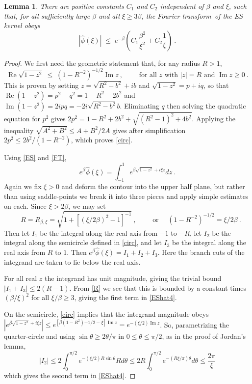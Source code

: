 \documentclass[10pt]{article}
\newcommand{\be}{\begin{equation}}
\newcommand{\ee}{\end{equation}}
\DeclareMathOperator{\re}{Re}
\DeclareMathOperator{\im}{Im}
\newtheorem{lem}[thm]{Lemma}
\newcommand{\freq}{\beta}          %
\newcommand{\FT}{Fourier transform}
\begin{document}
\begin{lem}
  There are positive constants $C_1$ and $C_2$ independent of
  $\freq$ and $\xi$, such that, for all
  sufficiently large $\freq$ and all $\xi\ge 3\freq$,
  the \FT\ of the ES kernel obeys
  \be
  |\hat\phi(\xi)| \;\le\; e^{-\beta}\left(
  C_1 \frac{\freq^2}{\xi^2}
  + C_2\frac{1}{\xi} \right)
  ~.
  \label{EShat4}
  \ee
  \label{l:EShat4}
\end{lem}
\begin{proof}
  We first need the geometric statement that, for any radius $R>1$,
  \be
  \re \sqrt{1-z^2} \; \le \; (1-R^{-2})^{-1/2} \im z ~, \qquad
  \mbox{ for all $z$ with $|z|=R$ and $\im z \ge 0$}~.
  \label{circ}
  \ee
  This is proven by setting $z=\sqrt{R^2-b^2}+ib$ and $\sqrt{1-z^2} = p+iq$,
  so that $\re (1-z^2) = p^2-q^2 = 1-R^2-2b^2$ and
  $\im (1-z^2) = 2ipq = -2i\sqrt{R^2-b^2}b$.
  Eliminating $q$ then solving the quadratic
  equation for $p^2$ gives
  $2p^2 = 1-R^2+2b^2 + \sqrt{(R^2-1)^2 + 4b^2}$.
  Applying the inequality $\sqrt{A^2+B^2}\le A + B^2/2A$ gives
  after simplification $2p^2 \le 2b^2/(1-R^{-2})$, which proves \eqref{circ}.

  Using \eqref{ES} and \eqref{FT},
  $$
  e^\freq \hat\phi(\xi) = \int_{-1}^1 e^{\freq \sqrt{1-z^2} + i\xi z} dz~.
  $$
  Again we fix $\xi>0$ and deform the contour into the upper half plane,
  but rather than using saddle-points we break it into three pieces
  and apply simple estimates on each.
  Since $\xi>2\beta$, we may set
  \be
  \quad R = R_{\freq,\xi} = \sqrt{1+[(\xi/2\freq)^2-1]^{-1}}~,
  \qquad \mbox{ or }\quad
  (1-R^{-2})^{-1/2} = \xi/2\freq~.
  \label{R}
  \ee
  Then let $I_1$ be the integral along the real axis from $-1$ to $-R$,
  let $I_2$ be the integral along the semicircle defined in \eqref{circ},
  and let $I_3$ be the integral along the real axis from $R$ to $1$.
  Then $e^\freq \hat\phi(\xi) = I_1+I_2+I_3$.
  Here the branch cuts of the integrand are taken to lie below the
  real axis.
  
  For all real $z$ the integrand has unit magnitude, giving the trivial bound
  $|I_1+I_3| \le 2(R-1)$. From \eqref{R} we see that this is bounded
  by a constant times $(\freq/\xi)^2$ for all $\xi/\freq \ge 3$, giving
  the first term in \eqref{EShat4}.

  On the semicircle, \eqref{circ} implies that the integrand magnitude
  obeys
  $|e^{\freq \sqrt{1-z^2} + i\xi z}| \le e^{[\beta(1-R^2){-1/2} - \xi] \im z} =
  e^{-(\xi/2)\im z}$.
  So, parametrizing the quarter-circle and using $\sin\theta \ge 2\theta/\pi$
  in $0\le\theta\le \pi/2$, as in the proof of Jordan's lemma, 
  $$
  |I_2| \le 2 \int_0^{\pi/2} e^{-(\xi/2) R \sin\theta} R d\theta
  \le 2R \int_0^{\pi/2} e^{-(R\xi/\pi) \theta} d\theta
  \le \frac{2\pi}{\xi}
  $$
  which gives the second term in \eqref{EShat4}.
\end{proof}
\end{document}
